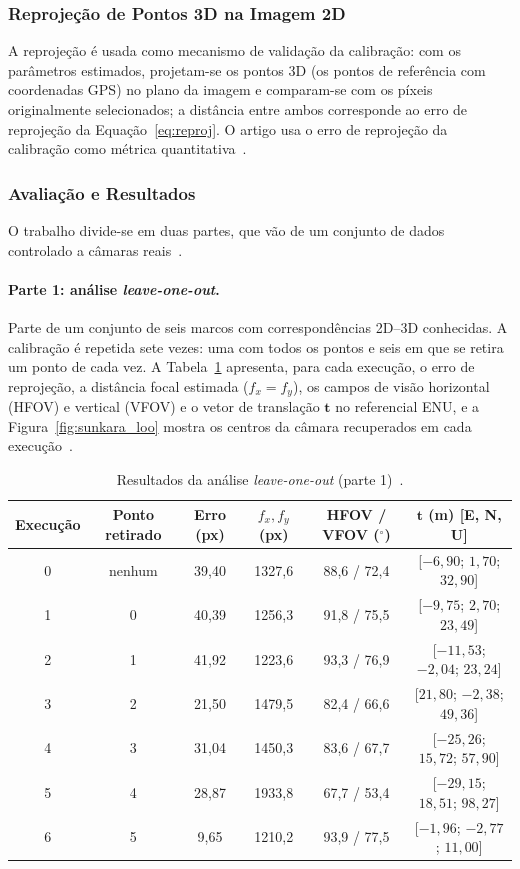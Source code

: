 \subsubsection{Reprojeção de Pontos 3D na Imagem 2D}

A reprojeção é usada como mecanismo de validação da calibração: com os parâmetros estimados, projetam-se os pontos 3D (os pontos de referência com coordenadas GPS) no plano da imagem e comparam-se com os píxeis originalmente selecionados; a distância entre ambos corresponde ao erro de reprojeção da Equação~\eqref{eq:reproj}. O artigo usa o erro de reprojeção da calibração como métrica quantitativa~\cite{sunkara2025}.

\subsubsection{Avaliação e Resultados}
\label{sec:sunkara_resultados}

O trabalho divide-se em duas partes, que vão de um conjunto de dados controlado a câmaras reais~\cite{sunkara2025}.

\paragraph{Parte 1: análise \textit{leave-one-out}.} Parte de um conjunto de seis marcos com correspondências 2D--3D conhecidas. A calibração é repetida sete vezes: uma com todos os pontos e seis em que se retira um ponto de cada vez. A Tabela~\ref{tab:sunkara_loo} apresenta, para cada execução, o erro de reprojeção, a distância focal estimada ($f_x=f_y$), os campos de visão horizontal (HFOV) e vertical (VFOV) e o vetor de translação $\mathbf{t}$ no referencial ENU, e a Figura~\ref{fig:sunkara_loo} mostra os centros da câmara recuperados em cada execução~\cite{sunkara2025}.

\begin{table}[htbp]
\centering
\caption{Resultados da análise \textit{leave-one-out} (parte 1)~\cite{sunkara2025}.}
\label{tab:sunkara_loo}
\small
\begin{tabular}{cccccc}
\hline
\textbf{Execução} & \textbf{Ponto retirado} & \textbf{Erro (px)} & \textbf{$f_x,f_y$ (px)} & \textbf{HFOV / VFOV ($^{\circ}$)} & \textbf{$\mathbf{t}$ (m) [E, N, U]} \\
\hline
0 & nenhum & 39,40 & 1327,6 & 88,6 / 72,4 & [$-6{,}90$; $1{,}70$; $32{,}90$] \\
1 & 0 & 40,39 & 1256,3 & 91,8 / 75,5 & [$-9{,}75$; $2{,}70$; $23{,}49$] \\
2 & 1 & 41,92 & 1223,6 & 93,3 / 76,9 & [$-11{,}53$; $-2{,}04$; $23{,}24$] \\
3 & 2 & 21,50 & 1479,5 & 82,4 / 66,6 & [$21{,}80$; $-2{,}38$; $49{,}36$] \\
4 & 3 & 31,04 & 1450,3 & 83,6 / 67,7 & [$-25{,}26$; $15{,}72$; $57{,}90$] \\
5 & 4 & 28,87 & 1933,8 & 67,7 / 53,4 & [$-29{,}15$; $18{,}51$; $98{,}27$] \\
6 & 5 & 9,65 & 1210,2 & 93,9 / 77,5 & [$-1{,}96$; $-2{,}77$; $11{,}00$] \\
\hline
\end{tabular}
\end{table}

